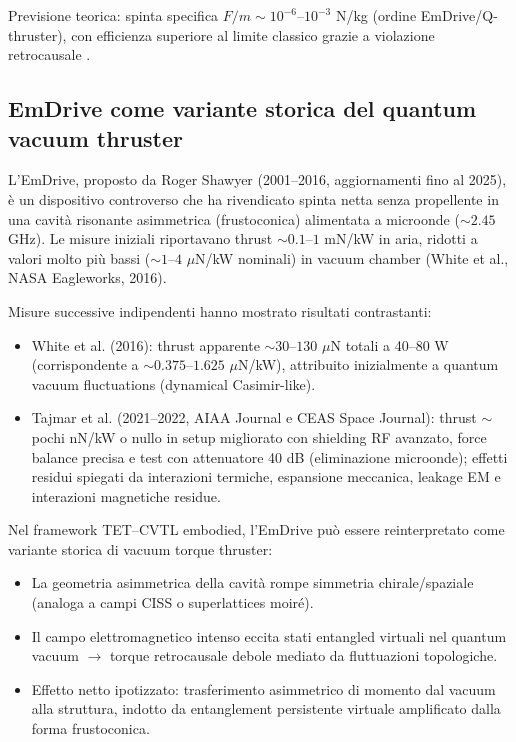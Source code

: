 \documentclass[11pt,a4paper]{article}
\let\oldcite\cite
\renewcommand{\cite}{\protect\oldcite}
\theoremstyle{plain}
\theoremstyle{definition}
\begin{document}
\vspace{0.3cm}

Previsione teorica: spinta specifica $F/m \sim 10^{-6}$–$10^{-3}$ N/kg (ordine EmDrive/Q-thruster), con efficienza superiore al limite classico grazie a violazione retrocausale \cite{Soliman2025vacuumtorque}.



\vspace{0.4cm}

\subsection{EmDrive come variante storica del quantum vacuum thruster}

L’EmDrive, proposto da Roger Shawyer (2001--2016, aggiornamenti fino al 2025), è un dispositivo controverso che ha rivendicato spinta netta senza propellente in una cavità risonante asimmetrica (frustoconica) alimentata a microonde ($\sim 2.45$ GHz). Le misure iniziali riportavano thrust $\sim 0.1$--$1$ mN/kW in aria, ridotti a valori molto più bassi ($\sim 1$--$4$ $\mu$N/kW nominali) in vacuum chamber (White et al., NASA Eagleworks, 2016).

Misure successive indipendenti hanno mostrato risultati contrastanti:
\begin{itemize}
    \item White et al. (2016): thrust apparente $\sim 30$--$130$ $\mu$N totali a 40--80 W (corrispondente a $\sim 0.375$--$1.625$ $\mu$N/kW), attribuito inizialmente a quantum vacuum fluctuations (dynamical Casimir-like).
    \item Tajmar et al. (2021--2022, AIAA Journal e CEAS Space Journal): thrust $\sim$ pochi nN/kW o nullo in setup migliorato con shielding RF avanzato, force balance precisa e test con attenuatore 40 dB (eliminazione microonde); effetti residui spiegati da interazioni termiche, espansione meccanica, leakage EM e interazioni magnetiche residue.
\end{itemize}

Nel framework TET--CVTL embodied, l’EmDrive può essere reinterpretato come variante storica di vacuum torque thruster:
\begin{itemize}
    \item La geometria asimmetrica della cavità rompe simmetria chirale/spaziale (analoga a campi CISS o superlattices moiré).
    \item Il campo elettromagnetico intenso eccita stati entangled virtuali nel quantum vacuum $\to$ torque retrocausale debole mediato da fluttuazioni topologiche.
    \item Effetto netto ipotizzato: trasferimento asimmetrico di momento dal vacuum alla struttura, indotto da entanglement persistente virtuale amplificato dalla forma frustoconica.
\end{itemize}
\end{document}
